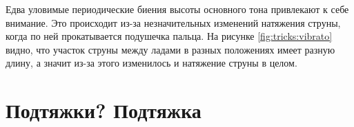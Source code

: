 Едва уловимые периодические биения высоты основного тона привлекают к себе внимание. Это происходит из-за незначительных изменений натяжения струны, когда по ней прокатывается подушечка пальца. На рисунке \ref{fig:tricks:vibrato} видно, что участок струны между ладами в разных положениях имеет разную длину, а значит из-за этого изменилось и натяжение струны в целом.


\section{Подтяжки? Подтяжка}


